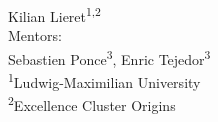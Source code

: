 \begin{frame}{}
	\begin{center}
		{
			{
				\Large \inserttitle
			}\\[0.7ex]
			{
				\large \insertsubtitle
			}
		}\\[2ex]
	   Kilian Lieret\textsuperscript{1,2}\\[2ex]
	   {
	   	\small
	   	Mentors:\\[0ex]
	   	Sebastien Ponce\textsuperscript{3}, 
	   	Enric Tejedor\textsuperscript{3}
	   }
	   \\[2.5 ex]
		{
			\footnotesize
			\textsuperscript{1}Ludwig-Maximilian University\\[0ex]
			\vspace{-1ex}\textsuperscript{2}Excellence Cluster Origins
		}\\[2.5ex]
		

\end{center}
\end{frame}
